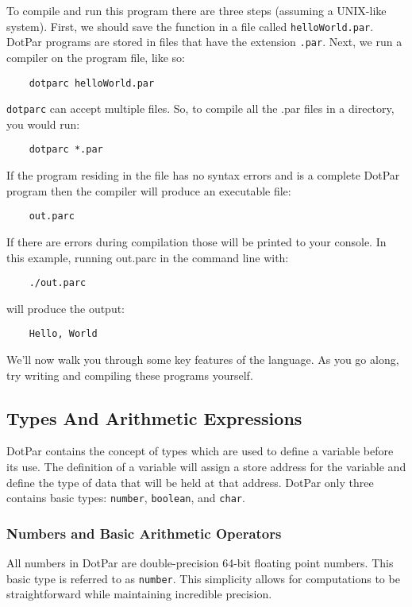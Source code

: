 \documentclass{article}
\begin{document}
To compile and run this program there are three steps (assuming a UNIX-like system). First, we should save the function in a file called \verb!helloWorld.par!. DotPar programs are stored in files that have the extension \verb!.par!. Next, we run a compiler on the program file, like so:

\begin{verbatim}
    dotparc helloWorld.par
\end{verbatim}

\verb!dotparc! can accept multiple files. So, to compile all the .par files in a directory, you would run: 

\begin{verbatim}
    dotparc *.par
\end{verbatim}

If the program residing in the file has no syntax errors and is a complete DotPar program then the compiler will produce an executable file:

\begin{verbatim}
    out.parc
\end{verbatim}

If there are errors during compilation those will be printed to your console. In this example, running out.parc in the command line with:

\begin{verbatim}
    ./out.parc
\end{verbatim}

will produce the output:

\begin{verbatim}
    Hello, World
\end{verbatim}

We’ll now walk you through some key features of the language. As you go along, try writing and compiling these programs yourself.

\subsection{Types And Arithmetic Expressions}

DotPar contains the concept of types which are used to define a variable before its use.  The definition of a variable will assign a store address for the variable and define the type of data that will be held at that address.  DotPar only three contains basic types: \verb!number!, \verb!boolean!, and \verb!char!.

\subsubsection{Numbers and Basic Arithmetic Operators}
All numbers in DotPar are double-precision 64-bit floating point numbers.  This basic type is referred to as \verb!number!.  This simplicity allows for computations to be straightforward while maintaining incredible precision.
\end{document}
